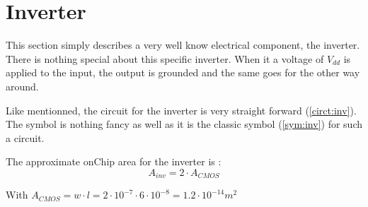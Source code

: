 \section{Inverter}
\label{sec:inv}

This section simply describes a very well know electrical component, the inverter. There is nothing special about this specific inverter. When it a voltage of $V_{dd}$ is applied to the input, the output is grounded and the same goes for the other way around.

\begin{figure}[H]
  \centering
  \hspace*{2.5cm}
  \hfill
  \hspace*{1.5cm}
  \caption{}
  \label{fig:inv}
\end{figure}

Like mentionned, the circuit for the inverter is very straight forward (\cref{circt:inv}). The symbol is nothing fancy as well as it is the classic symbol (\cref{sym:inv}) for such a circuit.

The approximate onChip area for the inverter is :
\begin{equation}
  A_{inv}=2\cdot A_{CMOS}
\end{equation}

With $A_{CMOS}= w\cdot l=2\cdot 10^{-7}\cdot6\cdot10^{-8} =1.2\cdot10^{-14}m^2$
